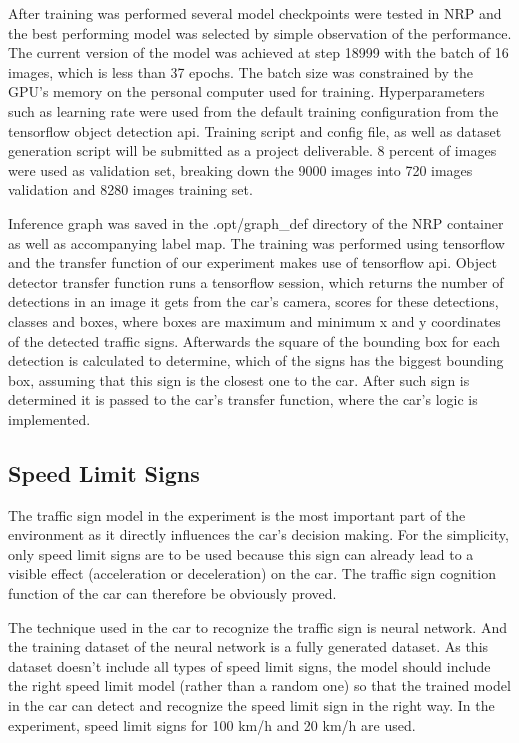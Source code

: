 After training was performed several model checkpoints were tested in NRP and the best performing model was selected by simple observation of the performance. The current version of the model was achieved at step 18999 with the batch of 16 images, which is less than 37 epochs. The batch size was constrained by the GPU's memory on the personal computer used for training. Hyperparameters such as learning rate were used from the default training configuration from the tensorflow object detection api. Training script and config file, as well as dataset generation script will be submitted as a project deliverable. 8 percent of images were used as validation set, breaking down the 9000 images into 720 images validation and 8280 images training set.


Inference graph was saved in the .opt/graph\_def directory of the NRP container as well as accompanying label map. The training was performed using tensorflow and the transfer function of our experiment makes use of tensorflow api. Object detector transfer function runs a tensorflow session, which returns the number of detections in an image it gets from the car's camera, scores for these detections, classes and boxes, where boxes are maximum and minimum x and y coordinates of the detected traffic signs. Afterwards the square of the bounding box for each detection is calculated to determine, which of the signs has the biggest bounding box, assuming that this sign is the closest one to the car. After such sign is determined it is passed to the car's transfer function, where the car's logic is implemented. 


\subsection{Speed Limit Signs}

The traffic sign model in the experiment is the most important part of the environment as it directly influences the car’s decision making. For the simplicity, only speed limit signs are to be used because this sign can already lead to a visible effect (acceleration or deceleration) on the car. The traffic sign cognition function of the car can therefore be obviously proved. 



The technique used in the car to recognize the traffic sign is neural network. And the training dataset of the neural network is a fully generated dataset. As this dataset doesn’t include all types of speed limit signs, the model should include the right speed limit model (rather than a random one) so that the trained model in the car can detect and recognize the speed limit sign in the right way. In the experiment, speed limit signs for 100 km/h and 20 km/h are used.



